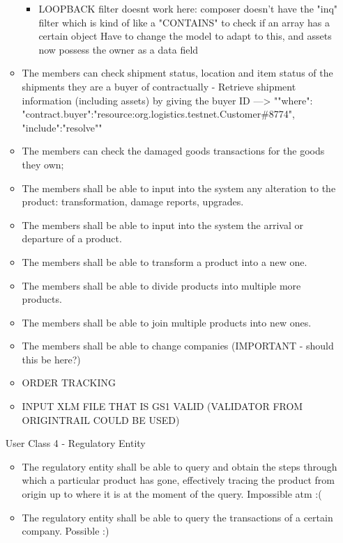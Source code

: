 \begin{itemize}
\begin{itemize}
\begin{itemize}
				 \item LOOPBACK filter doesnt work here: composer doesn't have the "inq" filter which is kind of like a "CONTAINS" to check if an array has a certain object
                 Have to change the model to adapt to this, and assets now possess the owner as a data field
            \end{itemize}
			\item The members can check shipment status, location and item status of the shipments they are a buyer of contractually - Retrieve shipment information (including assets) by giving the buyer ID --->  "{"where": {"contract.buyer":"resource:org.logistics.testnet.Customer\#8774"}, "include":"resolve"}"  
			\item The members can check the damaged goods transactions for the goods they own;
			\item The members shall be able to input into the system any alteration to the product: transformation, damage reports, upgrades.
			\item The members shall be able to input into the system the arrival or departure of a product.
			\item The members shall be able to transform a product into a new one.
			\item The members shall be able to divide products into multiple more products.
			\item The members shall be able to join multiple products into new ones.
			\item The members shall be able to change companies (IMPORTANT - should this be here?)
			\item ORDER TRACKING
			\item INPUT XLM FILE THAT IS GS1 VALID (VALIDATOR FROM ORIGINTRAIL COULD BE USED)
        \end{itemize}

        \par User Class 4 - Regulatory Entity
        \begin{itemize}
			\item The regulatory entity shall be able to query and obtain the steps through which a particular product has gone, effectively tracing the product from origin up to where it is at the moment of the query.  Impossible atm :(
			\item  The regulatory entity shall be able to query the transactions of a certain company. Possible :)
        \end{itemize}
		

\end{itemize}
